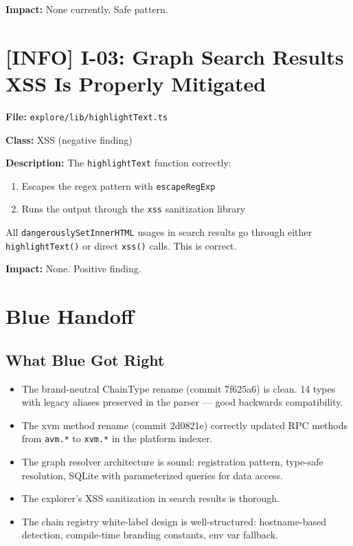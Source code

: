 \documentclass{article}
\begin{document}
\textbf{Impact:} None currently. Safe pattern.


\section{[INFO] I-03: Graph Search Results XSS Is Properly Mitigated}

\textbf{File:} \texttt{explore/lib/highlightText.ts}

\textbf{Class:} XSS (negative finding)

\textbf{Description:}
The \texttt{highlightText} function correctly:
\begin{enumerate}
  \item Escapes the regex pattern with \texttt{escapeRegExp}
  \item Runs the output through the \texttt{xss} sanitization library
\end{enumerate}

All \texttt{dangerouslySetInnerHTML} usages in search results go through
either \texttt{highlightText()} or direct \texttt{xss()} calls. This is
correct.

\textbf{Impact:} None. Positive finding.


\section{Blue Handoff}

\subsection*{What Blue Got Right}
\begin{itemize}
  \item The brand-neutral ChainType rename (commit 7f625a6) is clean.
        14 types with legacy aliases preserved in the parser --- good
        backwards compatibility.
  \item The xvm method rename (commit 2d0821e) correctly updated RPC methods
        from \texttt{avm.*} to \texttt{xvm.*} in the platform indexer.
  \item The graph resolver architecture is sound: registration pattern,
        type-safe resolution, SQLite with parameterized queries for data access.
  \item The explorer's XSS sanitization in search results is thorough.
  \item The chain registry white-label design is well-structured:
        hostname-based detection, compile-time branding constants, env var
        fallback.
\end{itemize}
\end{document}
